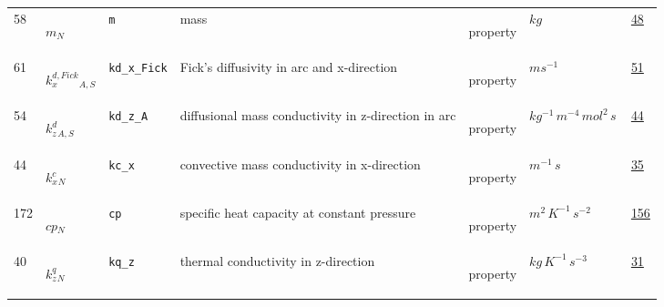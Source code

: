 \begin{longtable}{|p{1cm}|p{2.5cm}|p{4.5cm}|p{8cm}|p{3.0cm}|p{3cm}|p{1cm}|}
            58
             & \hypertarget{"v:58"}{ $ {m}{_{N}} $}
             & \verb|m|
             & mass
             & \begin{lay}property \end{lay}
             & $ kg \, $
             &                 \hyperlink{"e:48"}{ 48 }
                 \\
            61
             & \hypertarget{"v:61"}{ $ {{k^{d,Fick}_x}}{_{A, S}} $}
             & \verb|kd_x_Fick|
             & Fick's diffusivity in arc and x-direction 
             & \begin{lay}property \end{lay}
             & $ m s^{-1} \, $
             &                 \hyperlink{"e:51"}{ 51 }
                 \\
            54
             & \hypertarget{"v:54"}{ $ {{k^d_z}}{_{A, S}} $}
             & \verb|kd_z_A|
             & diffusional mass conductivity in z-direction in arc
             & \begin{lay}property \end{lay}
             & $ kg^{-1} \,m^{-4} \,mol^{2} \,s \, $
             &                 \hyperlink{"e:44"}{ 44 }
                 \\
            44
             & \hypertarget{"v:44"}{ $ {{k^c_x}}{_{N}} $}
             & \verb|kc_x|
             &  convective mass conductivity in x-direction
             & \begin{lay}property \end{lay}
             & $ m^{-1} \,s \, $
             &                 \hyperlink{"e:35"}{ 35 }
                 \\
            172
             & \hypertarget{"v:172"}{ $ {cp}{_{N}} $}
             & \verb|cp|
             & specific heat capacity at constant pressure
             & \begin{lay}property \end{lay}
             & $ m^{2} \,K^{-1} \,s^{-2} \, $
             &                 \hyperlink{"e:156"}{ 156 }
                 \\
            40
             & \hypertarget{"v:40"}{ $ {{k^q_z}}{_{N}} $}
             & \verb|kq_z|
             & thermal conductivity in z-direction
             & \begin{lay}property \end{lay}
             & $ kg \,K^{-1} \,s^{-3} \, $
             &                 \hyperlink{"e:31"}{ 31 }
                 \\

\end{longtable}
